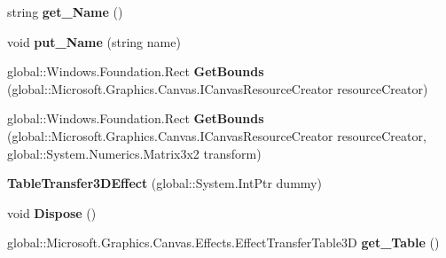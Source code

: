 \begin{DoxyCompactItemize}
string {\bfseries get\+\_\+\+Name} ()
\item 
\mbox{\label{class_microsoft_1_1_graphics_1_1_canvas_1_1_effects_1_1_table_transfer3_d_effect_a0352b2dcc61f7ab281f41815ebaa9930}} 
void {\bfseries put\+\_\+\+Name} (string name)
\item 
\mbox{\label{class_microsoft_1_1_graphics_1_1_canvas_1_1_effects_1_1_table_transfer3_d_effect_af2b350f1269e83b795233803c6f61283}} 
global\+::\+Windows.\+Foundation.\+Rect {\bfseries Get\+Bounds} (global\+::\+Microsoft.\+Graphics.\+Canvas.\+I\+Canvas\+Resource\+Creator resource\+Creator)
\item 
\mbox{\label{class_microsoft_1_1_graphics_1_1_canvas_1_1_effects_1_1_table_transfer3_d_effect_af079ef57539db85abe983a0d4859ce4d}} 
global\+::\+Windows.\+Foundation.\+Rect {\bfseries Get\+Bounds} (global\+::\+Microsoft.\+Graphics.\+Canvas.\+I\+Canvas\+Resource\+Creator resource\+Creator, global\+::\+System.\+Numerics.\+Matrix3x2 transform)
\item 
\mbox{\label{class_microsoft_1_1_graphics_1_1_canvas_1_1_effects_1_1_table_transfer3_d_effect_af9a5033370f8687d7d67be5b377d59e5}} 
{\bfseries Table\+Transfer3\+D\+Effect} (global\+::\+System.\+Int\+Ptr dummy)
\item 
\mbox{\label{class_microsoft_1_1_graphics_1_1_canvas_1_1_effects_1_1_table_transfer3_d_effect_a8fea9844c0b93747df6430c49d676897}} 
void {\bfseries Dispose} ()
\item 
\mbox{\label{class_microsoft_1_1_graphics_1_1_canvas_1_1_effects_1_1_table_transfer3_d_effect_a8479c991b8673215ffa620b727b809f2}} 
global\+::\+Microsoft.\+Graphics.\+Canvas.\+Effects.\+Effect\+Transfer\+Table3D {\bfseries get\+\_\+\+Table} ()
\item 
\mbox{\label{class_microsoft_1_1_graphics_1_1_canvas_1_1_effects_1_1_table_transfer3_d_effect_aa43aa9c3e770ae4bd2b2ea28e4c714d2}} 

\end{DoxyCompactItemize}

